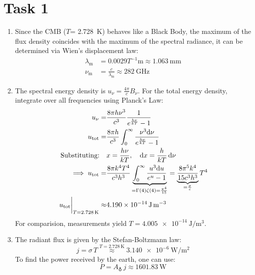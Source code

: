 \documentclass[11pt,a4paper]{scrartcl}
\newcommand{\lambdamax}{\ensuremath{\lambda_{\mathrm{m}}}}
\newcommand{\numax}{\ensuremath{\nu_{\mathrm{m}}}}
\newcommand{\Temp}{\ensuremath{T}}
\newcommand{\Unu}{\ensuremath{u_{\nu}}}
\newcommand{\Utot}{\ensuremath{u_{\mathrm{tot}}}}
\newcommand{\Bnu}{\ensuremath{B_{\nu}}}
\begin{document}
\section*{Task 1}

\begin{enumerate}[label=\textbf{\large(\alph*)}, itemsep=2\baselineskip]

\item
    Since the CMB (\Temp = \SI{2.728}{\kelvin}) behaves like a Black Body, the maximum of the flux density
    coincides with the maximum of the spectral radiance, it can be determined
    via Wien's displacement law:
    \begin{align*}
        \lambdamax &= 0.0029 T^{-1} \si{\metre} \approx \SI{1.063}{\milli\metre}
        \\
        \numax &= \frac{c}{\lambdamax} \approx \SI{282}{\giga\hertz}
    \end{align*}

\item
    The spectral energy density is $\Unu = \frac{4\pi}{c}\Bnu$. For the total
    energy density, integrate over all frequencies using Planck's Law:
    \begingroup
    \addtolength{\jot}{1em}
    \begin{align*}
        \Unu =& \frac{8\pi h\nu^3}{c^3}\frac{1}{e^{\frac{h\nu}{k\Temp}}-1}
        \\\
        \Utot =&
        \frac{8\pi h}{c^3}\int_{0}^{\infty}\frac{\nu^3\dd\nu}{e^{\frac{h\nu}{k\Temp}}-1}
        \\
        \textrm{Substituting:}\quad &x = \frac{h\nu}{k\Temp},\quad \dd{x} = \frac{h}{k\Temp}\dd{\nu} \\
        \implies \Utot =& \frac{8\pi k^4\Temp^4}{c^3 h^3}
        \underbrace{%
        \int_{0}^{\infty}\frac{u^3 \dd u}{e^u-1}
        }_{=\Gamma(4)\zeta(4)=\frac{\pi^4}{15}}
        = \underbrace{\frac{8\pi^5 k^4}{15 c^3 h^3}}
        _{=\frac{\sigma}{c}}
        \Temp^4 \\
        \eval{\Utot}_{\Temp=\SI{2.728}{\kelvin}}\approx&\SI{4.190e-14}{\joule\per\metre\cubed}
    \end{align*}
    \endgroup
    For comparision, measurements yield
    $\Temp=\SI{4.005e-14}{\joule\per\metre\cubed}$.

\item
    The radiant flux is given by the Stefan-Boltzmann law:
    \begin{equation*}
        j=\sigma\,\Temp\overset{\Temp=\SI{2.728}{\kelvin}}{\approx}\SI{3.140e-6}{\watt\per\metre\squared}
    \end{equation*}
    To find the power received by the earth, one can use:
    \begin{equation*}
        P = A_{\earth}\,j \approx \SI{1601.83}{\watt}
    \end{equation*}

\end{enumerate}
\end{document}

